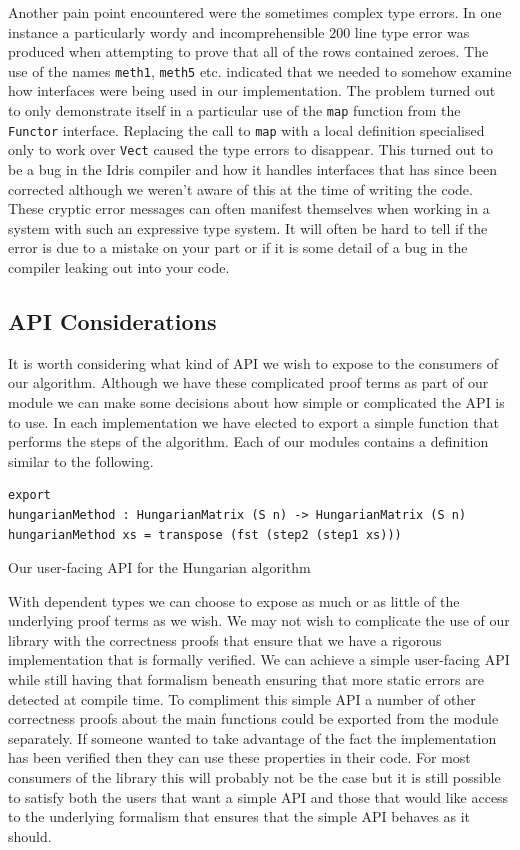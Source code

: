 \documentclass[a4paper, notitlepage]{report}
\begin{document}
Another pain point encountered were the sometimes complex type errors. In one
instance a particularly wordy and incomprehensible 200 line type error was
produced when attempting to prove that all of the rows contained zeroes. The use
of the names \texttt{meth1}, \texttt{meth5} etc. indicated that we needed to somehow examine how
interfaces were being used in our implementation. The problem turned out to only
demonstrate itself in a particular use of the \texttt{map} function from the \texttt{Functor}
interface. Replacing the call to \texttt{map} with a local definition specialised only to
work over \texttt{Vect} caused the type errors to disappear. This turned out to be a bug
in the Idris compiler and how it handles interfaces that has since been
corrected although we weren't aware of this at the time of writing the code.
These cryptic error messages can often manifest themselves when working in a
system with such an expressive type system. It will often be hard to tell if the
error is due to a mistake on your part or if it is some detail of a bug in the
compiler leaking out into your code.

\subsection{API Considerations}
\label{sec:orgbd8f65e}
It is worth considering what kind of API we wish to expose to the consumers of
our algorithm. Although we have these complicated proof terms as part of our
module we can make some decisions about how simple or complicated the API is to
use. In each implementation we have elected to export a simple function that
performs the steps of the algorithm. Each of our modules contains a definition
similar to the following.

\begin{listing}[H]
\begin{verbatim}
export
hungarianMethod : HungarianMatrix (S n) -> HungarianMatrix (S n)
hungarianMethod xs = transpose (fst (step2 (step1 xs)))
\end{verbatim}
\caption{Our user-facing API for the Hungarian algorithm}
\end{listing}

With dependent types we can choose to expose as much or as little of the
underlying proof terms as we wish. We may not wish to complicate the use of our
library with the correctness proofs that ensure that we have a rigorous
implementation that is formally verified. We can achieve a simple user-facing
API while still having that formalism beneath ensuring that more static errors
are detected at compile time. To compliment this simple API a number of other
correctness proofs about the main functions could be exported from the module
separately. If someone wanted to take advantage of the fact the implementation
has been verified then they can use these properties in their code. For most
consumers of the library this will probably not be the case but it is still
possible to satisfy both the users that want a simple API and those that would
like access to the underlying formalism that ensures that the simple API behaves
as it should.
\end{document}

